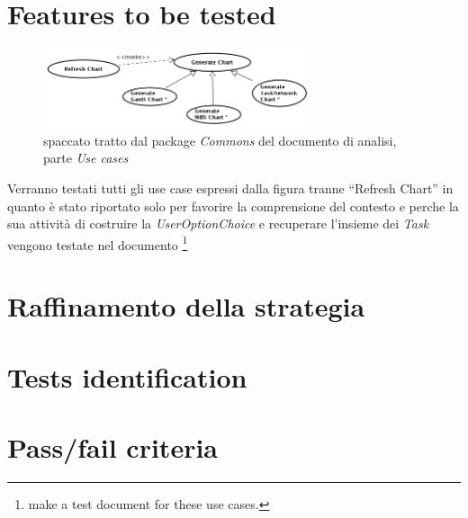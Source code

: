 \section{Features to be tested}
\begin{figure}[h!] 
\centering 
\includegraphics[width=0.7\textwidth]{desing_spec/GenerateChart.png}
\caption{spaccato tratto dal package \emph{Commons} del documento di analisi,
parte \emph{Use cases}}
\end{figure}
Verranno testati tutti gli use case espressi dalla figura tranne ``Refresh
Chart'' in quanto \`e stato riportato solo per favorire la comprensione del
contesto e perche la sua attivit\`a di costruire la \emph{UserOptionChoice} e
recuperare l'insieme dei \emph{Task} vengono testate nel documento
\footnote{make a test document for these use cases.}
\section{Raffinamento della strategia}

\section{Tests identification}

\section{Pass/fail criteria}